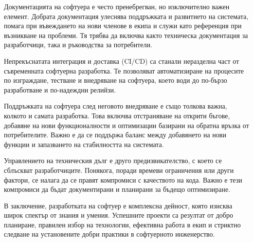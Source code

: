 Документацията на софтуера е често пренебрегван, но изключително важен елемент. Добрата документация улеснява поддръжката и развитието на системата, помага при въвеждането на нови членове в екипа и служи като референция при възникване на проблеми. Тя трябва да включва както техническа документация за разработчици, така и ръководства за потребители.

Непрекъснатата интеграция и доставка (CI/CD) са станали неразделна част от съвременната софтуерна разработка. Те позволяват автоматизиране на процесите по изграждане, тестване и внедряване на софтуера, което води до по-бързо разработване и по-надеждни релийзи.

Поддръжката на софтуера след неговото внедряване е също толкова важна, колкото и самата разработка. Това включва отстраняване на открити бъгове, добавяне на нови функционалности и оптимизации базирани на обратна връзка от потребителите. Важно е да се поддържа баланс между добавянето на нови функции и запазването на стабилността на системата.

Управлението на техническия дълг е друго предизвикателство, с което се сблъскват разработчиците. Понякога, поради времеви ограничения или други фактори, се налага да се правят компромиси с качеството на кода. Важно е тези компромиси да бъдат документирани и планирани за бъдещо оптимизиране.

В заключение, разработката на софтуер е комплексна дейност, която изисква широк спектър от знания и умения. Успешните проекти са резултат от добро планиране, правилен избор на технологии, ефективна работа в екип и стриктно следване на установените добри практики в софтуерното инженерство.
